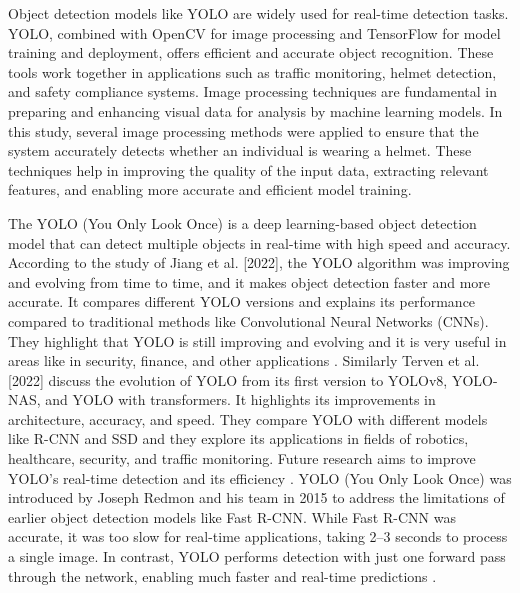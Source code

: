 \begin{refsection}
    Object detection models like YOLO are widely used for real-time detection tasks. YOLO, combined with OpenCV for image processing and TensorFlow for model training and deployment, offers efficient and accurate object recognition. These tools work together in applications such as traffic monitoring, helmet detection, and safety compliance systems.  Image processing techniques are fundamental in preparing and enhancing visual data for analysis by machine learning models. In this study, several image processing methods were applied to ensure that the system accurately detects whether an individual is wearing a helmet. These techniques help in improving the quality of the input data, extracting relevant features, and enabling more accurate and efficient model training.

    The YOLO (You Only Look Once) is a deep learning-based object detection model that can detect multiple objects in real-time with high speed and accuracy. According to the study of Jiang et al. [2022], the YOLO algorithm was improving and evolving from time to time, and it makes object detection faster and more accurate. It compares different YOLO versions and explains its performance compared to traditional methods like Convolutional Neural Networks (CNNs). They highlight that YOLO is still improving and evolving and it is very useful in areas like in security, finance, and other applications \cite{jiang2022review}. Similarly Terven et al. [2022] discuss the evolution of YOLO from its first version to YOLOv8, YOLO-NAS, and YOLO with transformers. It highlights its improvements in architecture, accuracy, and speed. They compare YOLO with different models like R-CNN and SSD and they explore its applications in fields of robotics, healthcare, security, and traffic monitoring. Future research aims to improve YOLO’s real-time detection and its efficiency \cite{terven2022comprehensive}. YOLO (You Only Look Once) was introduced by Joseph Redmon and his team in 2015 to address the limitations of earlier object detection models like Fast R-CNN. While Fast R-CNN was accurate, it was too slow for real-time applications, taking 2–3 seconds to process a single image. In contrast, YOLO performs detection with just one forward pass through the network, enabling much faster and real-time predictions \cite{gfg2021yolo}.


\end{refsection}
